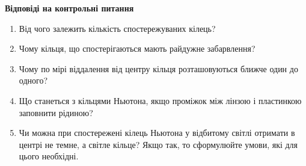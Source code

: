 \begin{center}
    \Large{\textbf{Відповіді на контрольні питання}}    
\end{center}

\vspace{1mm}

\begin{enumerate}
    \item Від чого залежить кількість спостережуваних кілець?
    \bigbreak

    
    \item Чому кільця, що спостерігаються мають райдужне забарвлення?
    \bigbreak
    
    
    \item Чому по мірі віддалення від центру кільця розташовуються ближче один
    до одного?
    \bigbreak


    \item Що станеться з кільцями Ньютона, якщо проміжок між лінзою і пластинкою заповнити рідиною?
    \bigbreak


    \item Чи можна при спостережені кілець Ньютона у відбитому світлі отримати в центрі не темне,
    а світле кільце? Якщо так, то сформулюйте умови, які для цього необхідні.
    \bigbreak


\end{enumerate}
